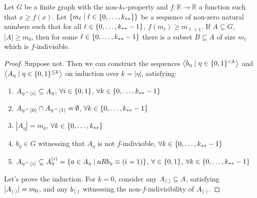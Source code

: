     \begin{lemma}[Claim 4.3] \label{lem:existance_of_indivisible_sets}
        Let $G$ be a finite graph with the non-$k_*$-property and $f: \mathbb{R} \longrightarrow \mathbb{R}$ a function
        such that $x \geq f(x)$.
        Let $\{ m_\ell \mid \ell \in \{ 0, \dots, k_{**} \} \}$ be a sequence of non-zero natural numbers such that
        for all $\ell \in \{ 0, \dots, k_{**}-1 \}$, $f(m_{\ell}) \geq m_{\ell+1}$.
        If $A \subseteq G$, $|A| \geq m_0$, then for some $\ell \in \{ 0, \dots, k_{**}-1 \}$ there is a subset $B \subseteq A$
        of size $m_\ell$ which is $f$-indivisible.
        \begin{proof}
            Suppose not.
            Then we can construct the sequences $\left< b_\eta \mid \eta \in \{ 0,1 \}^{<k} \right>$ and $\left< A_\eta \mid \eta \in \{ 0,1 \}^{\leq k} \right>$
            on induction over $k = |\eta|$, satisfying:
            \begin{enumerate}
                \item\label{itm:existance_of_indivisible_sets.1} $A_{\eta^\frown \left< i \right>} \subseteq A_{\eta}$, $\forall i \in \{ 0,1 \}$, $\forall k \in \{ 0, \dots, k_{**}-1 \}$
                \item\label{itm:existance_of_indivisible_sets.2} $A_{\eta^\frown \left< 0 \right>} \cap A_{\eta^\frown \left< 1 \right>} = \emptyset$, $\forall k \in \{ 0, \dots, k_{**}-1 \}$
                \item\label{itm:existance_of_indivisible_sets.3} $|A_\eta| = m_k$, $\forall k \in \{ 0, \dots, k_{**} \}$
                \item\label{itm:existance_of_indivisible_sets.4} $b_\eta \in G$ witnessing that $A_\eta$ is not $f$-indivisible, $\forall k \in \{ 0, \dots, k_{**}-1 \}$
                \item\label{itm:existance_of_indivisible_sets.5} $A_{\eta^\frown \left< i \right>} \subseteq A_\eta^{(i)} = \{ a \in A_\eta \mid a R b_\eta \equiv (i=1) \}$,
                    $\forall \in \{ 0,1 \}$, $\forall k \in \{ 0, \dots, k_{**}-1 \}$
            \end{enumerate}
            Let's prove the induction.
            For $k=0$, consider any $A_{\left< \cdot \right>} \subseteq A$, satisfying $|A_{\left< \cdot \right>}| = m_0$, and
            any $b_{\left< \cdot \right>}$ witnessing the non-$f$-indivisibility of $A_{\left< \cdot \right>}$.

\end{proof}
\end{lemma}

